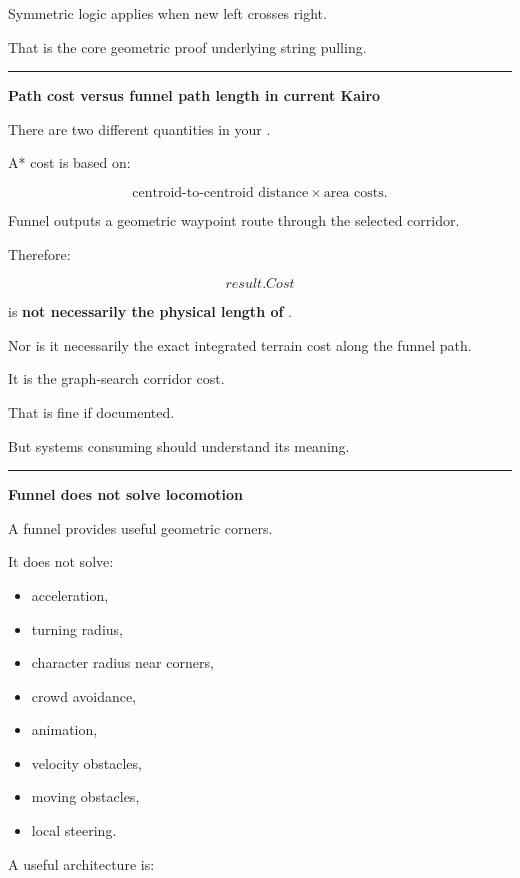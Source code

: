 Symmetric logic applies when new left crosses right.

That is the core geometric proof underlying string pulling.

\begin{center}\rule{0.5\linewidth}{0.5pt}\end{center}

\textbf{Path cost versus funnel path length in current Kairo}

There are two different quantities in your .

A* cost is based on:

\[
\text{centroid-to-centroid distance}
\times
\text{area costs}.
\]

Funnel outputs a geometric waypoint route through the selected corridor.

Therefore:

\[
result.Cost
\]

is \textbf{not necessarily the physical length of }.

Nor is it necessarily the exact integrated terrain cost along the funnel path.

It is the graph-search corridor cost.

That is fine if documented.

But systems consuming  should understand its meaning.

\begin{center}\rule{0.5\linewidth}{0.5pt}\end{center}

\textbf{Funnel does not solve locomotion}

A funnel provides useful geometric corners.

It does not solve:

\begin{itemize}
\tightlist
\item
  acceleration,
\item
  turning radius,
\item
  character radius near corners,
\item
  crowd avoidance,
\item
  animation,
\item
  velocity obstacles,
\item
  moving obstacles,
\item
  local steering.
\end{itemize}

A useful architecture is:

